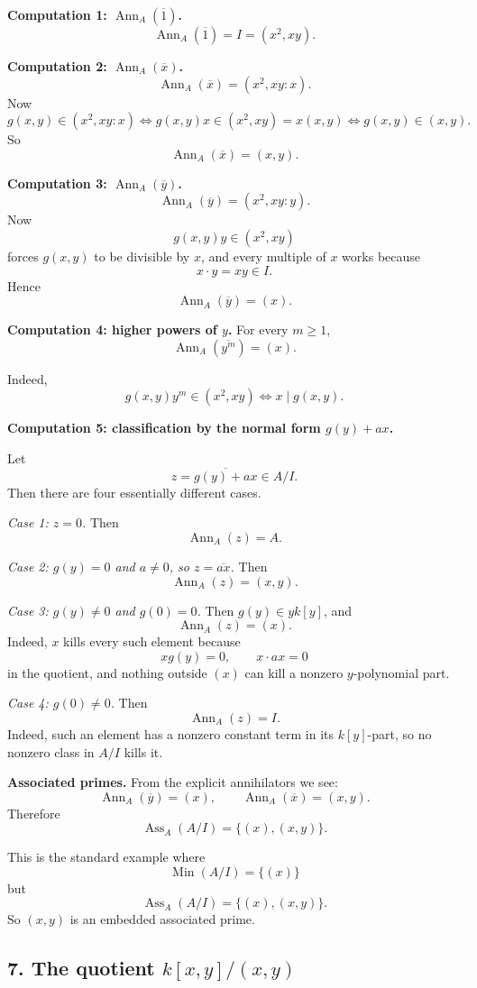 \documentclass[12pt,a4paper]{article}
\theoremstyle{notespace}
\DeclareMathOperator{\Ass}{Ass}
\DeclareMathOperator{\Ann}{Ann}
\DeclareMathOperator{\Min}{Min}
\begin{document}
\textbf{Computation 1: \(\Ann_A(\overline 1)\).}
\[
\Ann_A(\overline 1)=I=(x^2,xy).
\]

\textbf{Computation 2: \(\Ann_A(\overline x)\).}
\[
\Ann_A(\overline x)=(x^2,xy:x).
\]
Now
\[
g(x,y)\in (x^2,xy:x)
\iff g(x,y)x\in (x^2,xy)=x(x,y)
\iff g(x,y)\in (x,y).
\]
So
\[
\Ann_A(\overline x)=(x,y).
\]

\textbf{Computation 3: \(\Ann_A(\overline y)\).}
\[
\Ann_A(\overline y)=(x^2,xy:y).
\]
Now
\[
g(x,y)y\in (x^2,xy)
\]
forces \(g(x,y)\) to be divisible by \(x\), and every multiple of \(x\) works because
\[
x\cdot y=xy\in I.
\]
Hence
\[
\Ann_A(\overline y)=(x).
\]

\textbf{Computation 4: higher powers of \(y\).}
For every \(m\ge 1\),
\[
\Ann_A(\overline{y^m})=(x).
\]

Indeed,
\[
g(x,y)y^m\in (x^2,xy)
\iff x\mid g(x,y).
\]

\textbf{Computation 5: classification by the normal form \(g(y)+ax\).}

Let
\[
z=\overline{g(y)+ax}\in A/I.
\]
Then there are four essentially different cases.

\medskip

\emph{Case 1: \(z=0\).}
Then
\[
\Ann_A(z)=A.
\]

\medskip

\emph{Case 2: \(g(y)=0\) and \(a\neq 0\), so \(z=\overline{ax}\).}
Then
\[
\Ann_A(z)=(x,y).
\]

\medskip

\emph{Case 3: \(g(y)\neq 0\) and \(g(0)=0\).}
Then \(g(y)\in yk[y]\), and
\[
\Ann_A(z)=(x).
\]
Indeed, \(x\) kills every such element because
\[
xg(y)=0,\qquad x\cdot ax=0
\]
in the quotient, and nothing outside \((x)\) can kill a nonzero \(y\)-polynomial part.

\medskip

\emph{Case 4: \(g(0)\neq 0\).}
Then
\[
\Ann_A(z)=I.
\]
Indeed, such an element has a nonzero constant term in its \(k[y]\)-part, so no nonzero class in \(A/I\) kills it.

\medskip

\textbf{Associated primes.}
From the explicit annihilators we see:
\[
\Ann_A(\overline y)=(x),
\qquad
\Ann_A(\overline x)=(x,y).
\]
Therefore
\[
\Ass_A(A/I)=\{(x),(x,y)\}.
\]

This is the standard example where
\[
\Min(A/I)=\{(x)\}
\]
but
\[
\Ass_A(A/I)=\{(x),(x,y)\}.
\]
So \((x,y)\) is an embedded associated prime.

\subsection*{7. The quotient \(k[x,y]/(x,y)\)}
\end{document}
